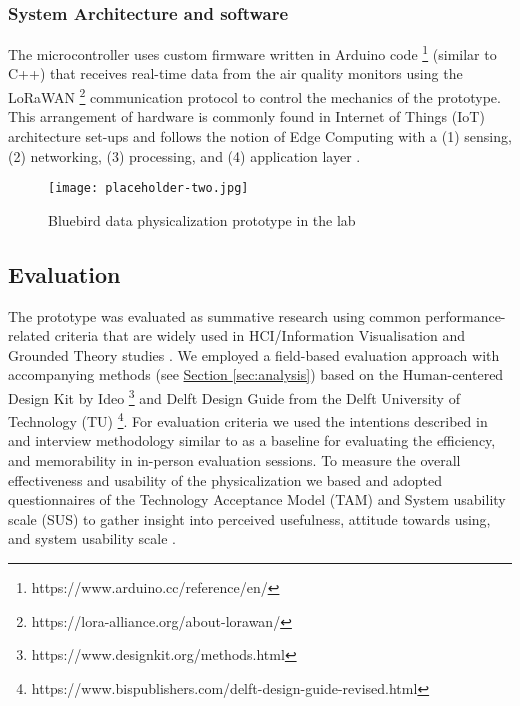 \subsubsection{System Architecture and software}

The microcontroller uses custom firmware written in Arduino code \footnote{https://www.arduino.cc/reference/en/} (similar to C++) that receives real-time data from the air quality monitors using the LoRaWAN \footnote{https://lora-alliance.org/about-lorawan/} communication protocol to control the mechanics of the prototype. This arrangement of hardware is commonly found in Internet of Things (IoT) architecture set-ups and follows the notion of Edge Computing with a (1) sensing, (2) networking, (3) processing, and (4) application layer \cite{li_edge-oriented_2019, idrees_edge_2018}.

\begin{figure}[!h]
    \centering
    \texttt{[image: placeholder-two.jpg]}
    \caption{Bluebird data physicalization prototype in the lab}
    \label{fig:complexity}
\end{figure}

\subsection{Evaluation}

The prototype was evaluated as summative research using common performance-related criteria that are widely used in HCI/Information Visualisation \cite{ranasinghe_encoding_2023} and Grounded Theory studies \cite{chun_tie_grounded_2019}. We employed a field-based evaluation approach with accompanying methods (see \hyperref[sec:analysis]{Section \ref*{sec:analysis}}) based on the Human-centered Design Kit by Ideo \footnote{https://www.designkit.org/methods.html} and Delft Design Guide from the Delft University of Technology (TU) \footnote{https://www.bispublishers.com/delft-design-guide-revised.html}. For evaluation criteria we used the intentions described in \cite{ranasinghe_encoding_2023} and interview methodology similar to \cite{jansen_evaluating_2013} as a baseline for evaluating the efficiency, and memorability in in-person evaluation sessions. To measure the overall effectiveness and usability of the physicalization we based and adopted questionnaires of the Technology Acceptance Model (TAM) and System usability scale (SUS) to gather insight into perceived usefulness, attitude towards using, and system usability scale \cite{davis_perceived_1989, brooke_sus_1996}. 

